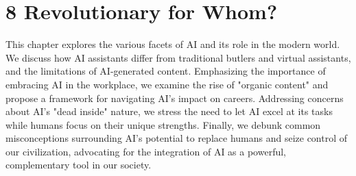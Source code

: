 \section*{8 Revolutionary for Whom?}

This chapter explores the various facets of AI and its role in the modern world. We discuss how AI assistants differ from traditional butlers and virtual assistants, and the limitations of AI-generated content. Emphasizing the importance of embracing AI in the workplace, we examine the rise of "organic content" and propose a framework for navigating AI’s impact on careers. Addressing concerns about AI’s "dead inside" nature, we stress the need to let AI excel at its tasks while humans focus on their unique strengths. Finally, we debunk common misconceptions surrounding AI’s potential to replace humans and seize control of our civilization, advocating for the integration of AI as a powerful, complementary tool in our society.
